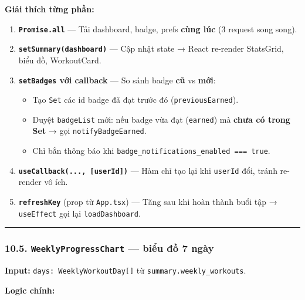 \documentclass[12pt,a4paper]{article}
\begin{document}
\textbf{Giải thích từng phần:}

\begin{enumerate}
\def\labelenumi{\arabic{enumi}.}
\tightlist
\item
  \textbf{\texttt{Promise.all}} --- Tải dashboard, badge, prefs
  \textbf{cùng lúc} (3 request song song).
\item
  \textbf{\texttt{setSummary(dashboard)}} --- Cập nhật state → React
  re-render StatsGrid, biểu đồ, WorkoutCard.
\item
  \textbf{\texttt{setBadges} với callback} --- So sánh badge \textbf{cũ}
  vs \textbf{mới}:

  \begin{itemize}
  \tightlist
  \item
    Tạo \texttt{Set} các id badge đã đạt trước đó
    (\texttt{previousEarned}).
  \item
    Duyệt \texttt{badgeList} mới: nếu badge vừa đạt (\texttt{earned}) mà
    \textbf{chưa có trong Set} → gọi \texttt{notifyBadgeEarned}.
  \item
    Chỉ bắn thông báo khi
    \texttt{badge\_notifications\_enabled\ ===\ true}.
  \end{itemize}
\item
  \textbf{\texttt{useCallback(...,\ {[}userId{]})}} --- Hàm chỉ tạo lại
  khi \texttt{userId} đổi, tránh re-render vô ích.
\item
  \textbf{\texttt{refreshKey}} (prop từ \texttt{App.tsx}) --- Tăng sau
  khi hoàn thành buổi tập → \texttt{useEffect} gọi lại
  \texttt{loadDashboard}.
\end{enumerate}

\begin{center}\rule{0.5\linewidth}{0.5pt}\end{center}

\subsubsection{\texorpdfstring{10.5. \texttt{WeeklyProgressChart} ---
biểu đồ 7
ngày}{10.5. WeeklyProgressChart --- biểu đồ 7 ngày}}\label{weeklyprogresschart-biux1ec3u-ux111ux1ed3-7-nguxe0y}

\textbf{Input:} \texttt{days:\ WeeklyWorkoutDay{[}{]}} từ
\texttt{summary.weekly\_workouts}.

\textbf{Logic chính:}
\end{document}
